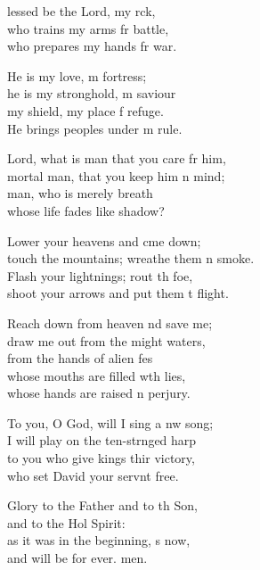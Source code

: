 \settowidth{\versewidth}{touch the mountains; wreathe them in smoke.}
\begin{psalmverse}%
  \begin{patverse}
lessed be the Lord, my rck,\Flex\\
who trains my arms fr battle,\Med\\
who prepares my hands fr war.

He is my love, m fortress;\Med\\
he is my stronghold, m saviour\\
my shield, my place f refuge.\Med\\
He brings peoples under m rule.

Lord, what is man that you care fr him,\Med\\
mortal man, that you keep him \pointup{\i}n mind;\\
man, who is merely  breath\Med\\
whose life fades like  shadow?

Lower your heavens and cme down;\Med\\
touch the mountains; wreathe them \pointup{\i}n smoke.\\
Flash your lightnings; rout th foe,\Med\\
shoot your arrows and put them t flight.

Reach down from heaven nd save me;\Med\\
draw me out from the might waters,\\
from the hands of alien fes\Flex\\
whose mouths are filled w\pointup{\i}th lies,\Med\\
whose hands are raised \pointup{\i}n perjury.

To you, O God, will I sing a nw song;\Med\\
I will play on the ten-str\pointup{\i}nged harp\\
to you who give kings thir victory,\Med\\
who set David your servnt free.

Glory to the Father and to th Son,\Med\\
and to the Hol Spirit:\\
as it was in the beginning, \pointup{\i}s now,\Med\\
and will be for ever. men.
  \end{patverse}
\end{psalmverse}
\setlength{\leftmargini}{\defleftmargini}  %
